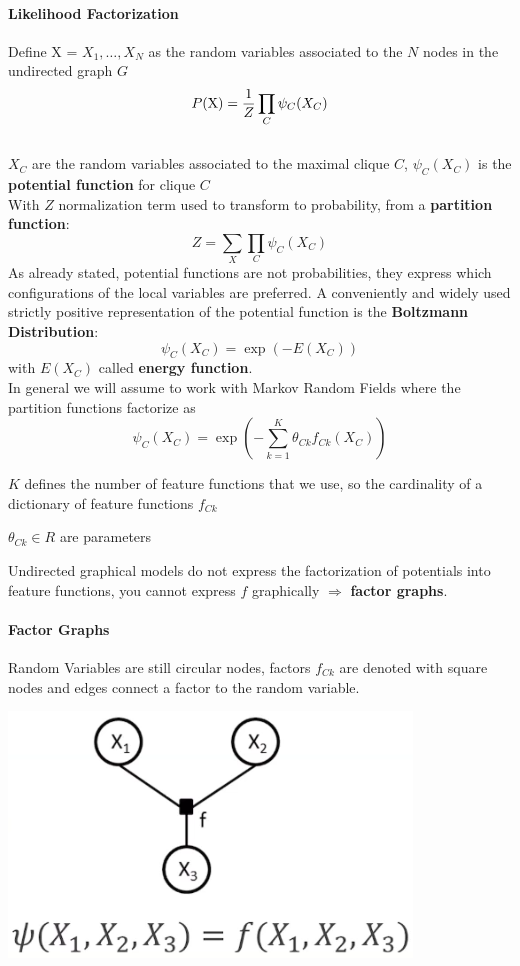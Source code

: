\documentclass[10pt]{report}
\begin{document}
\paragraph{Likelihood Factorization} Define X = $X_1,\ldots, X_N$ as the random variables associated to the $N$ nodes in the undirected graph $G$
$$P(\hbox{X}) = \frac{1}{Z}\prod_C \psi_C(X_C)$$\\
$X_C$ are the random variables associated to the maximal clique $C$, $\psi_C(X_C)$ is the \textbf{potential function} for clique $C$\\
With $Z$ normalization term used to transform to probability, from a \textbf{partition function}:
$$Z = \sum_X\prod_C\psi_C(X_C)$$
As already stated, potential functions are not probabilities, they express which configurations of the local variables are preferred. A conveniently and widely used strictly positive representation of the potential function is the \textbf{Boltzmann Distribution}:
$$\psi_C(X_C)=\exp\left(-E(X_C)\right)$$
with $E(X_C)$ called \textbf{energy function}.\\
In general we will assume to work with Markov Random Fields where the partition functions factorize as $$\psi_C(X_C) = \exp\left(-\sum_{k=1}^K\theta_{Ck}f_{Ck}(X_C)\right)$$
\begin{list}{}{}
	\item $K$ defines the number of feature functions that we use, so the cardinality of a dictionary of feature functions $f_{Ck}$
	\item $\theta_{Ck}\in R$ are parameters
\end{list}
Undirected graphical models do not express the factorization of potentials into feature functions, you cannot express $f$ graphically $\Rightarrow$ \textbf{factor graphs}.
\pagebreak
\paragraph{Factor Graphs} Random Variables are still circular nodes, factors $f_{Ck}$ are denoted with square nodes and edges connect a factor to the random variable.
\begin{center}
	\includegraphics[scale=0.5]{34.png}
\end{center}
\end{document}
